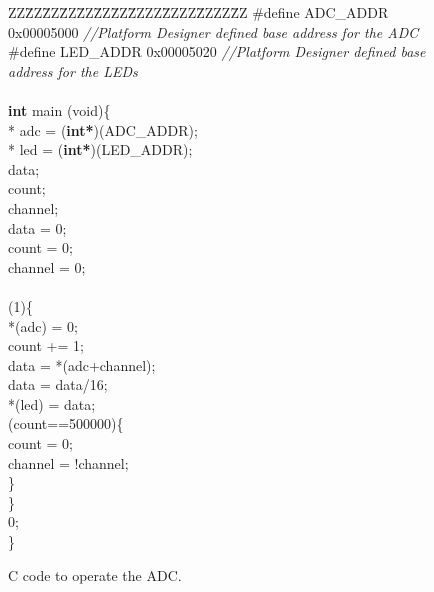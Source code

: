 \begin{figure}[h]

\begin{center} %
\parbox{12.5cm}{
\begin{tabbing}
ZZ\=ZZ\=ZZ\=ZZ\=ZZ\=ZZ\=ZZ\=ZZZZ\=ZZZZ\=ZZZZ\=ZZ\kill
\#define ADC\_ADDR 0x00005000 \hspace{1cm} {\it //Platform Designer defined base address for the ADC}\\
\#define LED\_ADDR 0x00005020 \hspace{1cm} {\it //Platform Designer defined base address for the LEDs}\\
\\
{\bf int} main (void)\{\\
 * adc = ({\bf int*})(ADC\_ADDR);\\
 * led = ({\bf int*})(LED\_ADDR);\\
 data;\\
 count;\\
 channel;\\
\>data = 0;\\
\>count = 0;\\
\>channel = 0;\\
\\
 (1)\{\\
\>\>*(adc) = 0;\>\>\>\>\>\>\\
\>\>count += 1;\\
\>\>data = *(adc+channel);\>\>\>\>\>\>\\
\>\>data = data/16;\>\>\>\>\>\>\\
\>\>*(led) = data;\>\>\>\>\>\>\\
\> (count==500000)\{\\
\>\>\>count = 0;\\
\>\>\>channel = !channel;\\
\>\>\}\\
\>\}\\
 0;\\
\}\\
\end{tabbing} } %
	\caption{C code to operate the ADC.}
	\label{fig:c_code}
\end{center}
\end{figure}